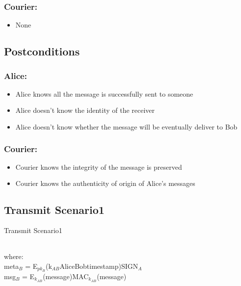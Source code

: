 \documentclass{article}
\begin{document}
\subsubsection*{Courier:}
\begin{itemize}
\item None
\end{itemize}

\subsection*{Postconditions}
\subsubsection*{Alice:}
\begin{itemize}
\item Alice knows all the message is successfully sent to someone
\item Alice doesn't know the identity of the receiver
\item Alice doesn't know whether the message will be eventually deliver to Bob
\end{itemize}

\subsubsection*{Courier:}
\begin{itemize}
\item Courier knows the integrity of the message is preserved
\item Courier knows the authenticity of origin of Alice's messages
\end{itemize}
\vspace{40pt}


\subsection*{Transmit Scenario1}
\begin{msc}{Transmit Scenario1}
\setlength{\instdist}{3\instdist}
\setlength{\envinstdist}{2\envinstdist}
\setlength{\levelheight}{1.5\levelheight}

\nextlevel[2]
\nextlevel
{}
\nextlevel[2]
\end{msc}
\\
where: \\
meta$_B$ = E$_{pk_B}$(k$_{AB}$\textbar Alice\textbar Bob\textbar timestamp)\textbar SIGN$_A$\\
msg$_B$ = E$_{k_{AB}}$(message)\textbar MAC$_{k_{AB}}$(message)
\end{document}
